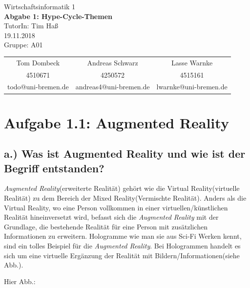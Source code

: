 \documentclass[12pt,utf8]{scrartcl}
\makeatletter
\newcommand{\teilnehmerI}{Tom Dombeck}
\newcommand{\mattI}{4510671}
\newcommand{\mailI}{todo@uni-bremen.de}
\newcommand{\teilnehmerII}{Andreas Schwarz}
\newcommand{\mattII}{4250572}
\newcommand{\mailII}{andreas4@uni-bremen.de}
\newcommand{\teilnehmerIII}{Lasse Warnke}
\newcommand{\mattIII}{4515161}
\newcommand{\mailIII}{lwarnke@uni-bremen.de}
\newcommand{\thisgroup}{A01}
\newcommand{\abgabedatum}{19.11.2018}
\newcommand{\nummer}{1}
\newcommand{\thema}{Hype-Cycle-Themen}
\newcommand{\thistutor}{Tim Haß}
\newcommand{\thiscourse}{Wirtschaftsinformatik 1}
\makeatother
\begin{document}
\begin{titlepage}
	\vspace*{\baselineskip}		
	\centering					
	\LARGE							
	\thiscourse \\ 					
	\vspace{1cm}					
	{\Huge 							
	\textbf{Abgabe \nummer: \thema}} \\ 
	\vspace{1.5cm} 					
	TutorIn: \thistutor \\ 		
	\abgabedatum \\ 				
	\vfill 							
	Gruppe: \thisgroup \\ 			
	\vspace{.5cm} 					
	\large 							
	\begin{tabular}{c|c|c} 		
	\teilnehmerI	& \teilnehmerII & \teilnehmerIII \\ 
	\mattI	& \mattII &  \mattIII\\ 
	\mailI	& \mailII & \mailIII \\ 
	\end{tabular} 
\end{titlepage}


\thispagestyle{empty}
\tableofcontents
\newpage
\setcounter{page}{1}


\section{\label{sec:thema}Aufgabe 1.1: Augmented Reality}
\subsection{\label{sub:thema}a.) Was ist Augmented Reality und wie ist der Begriff entstanden?}

\textit{Augmented Reality}(erweiterte Realität) gehört wie die Virtual Reality(virtuelle Realität) zu dem Bereich der Mixed Reality(Vermischte Realität). Anders als die Virtual Reality, wo eine Person vollkommen in einer virtuellen/künstlichen Realität hineinversetzt wird, befasst sich die \textit{Augmented Reality} mit der Grundlage, die bestehende Realität für eine Person mit zusätzlichen Informationen zu erweitern.\cite{PaulMilgram} Hologramme wie man sie aus Sci-Fi Werken kennt, sind ein tolles Beispiel für die \textit{Augmented Reality}. Bei Hologrammen handelt es sich um eine virtuelle Ergänzung der Realität mit Bildern/Informationen(siehe Abb.).%
\linebreak


Hier Abb.:
\end{document}
